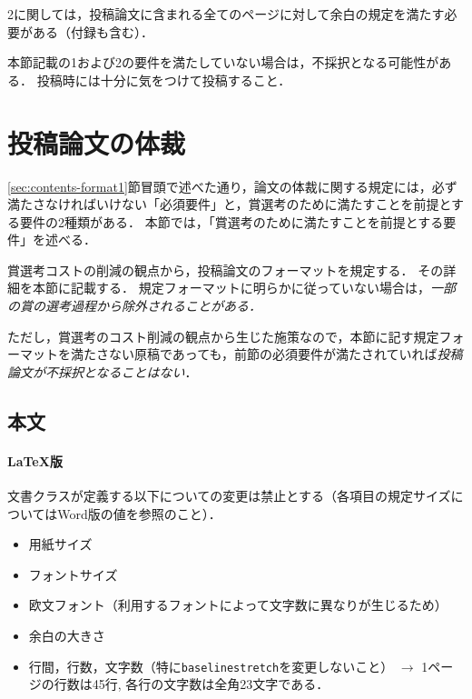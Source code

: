 \documentclass[
  platex, dvipdfmx,  %
]{nlp2026}
\newcommand{\code}[1]{\texttt{#1}}
\begin{document}
2に関しては，投稿論文に含まれる全てのページに対して余白の規定を満たす必要がある（付録も含む）．

本節記載の1および2の要件を満たしていない場合は，不採択となる可能性がある．
投稿時には十分に気をつけて投稿すること．



\section{投稿論文の体裁}
\label{sec:contents-format2}
\ref{sec:contents-format1}節冒頭で述べた通り，論文の体裁に関する規定には，必ず満たさなければいけない「必須要件」と，賞選考のために満たすことを前提とする要件の2種類がある．
本節では，「賞選考のために満たすことを前提とする要件」を述べる．

賞選考コストの削減の観点から，投稿論文のフォーマットを規定する．
その詳細を本節に記載する．
規定フォーマットに明らかに従っていない場合は，\emph{一部の賞の選考過程から除外されることがある．}

ただし，賞選考のコスト削減の観点から生じた施策なので，本節に記す規定フォーマットを満たさない原稿であっても，前節の必須要件が満たされていれば\emph{投稿論文が不採択となることはない}．



\subsection{本文}

\paragraph{LaTeX版}
文書クラスが定義する以下についての変更は禁止とする（各項目の規定サイズについてはWord版の値を参照のこと）．
\begin{itemize}
\item 用紙サイズ
\item フォントサイズ
\item 欧文フォント（利用するフォントによって文字数に異なりが生じるため）
\item 余白の大きさ
\item 行間，行数，文字数（特に\code{baselinestretch}を変更しないこと） $\rightarrow$ 1ページの行数は45行, 各行の文字数は全角23文字である．
\end{itemize}
\end{document}
